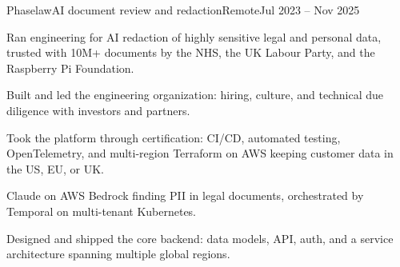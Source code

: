 \documentclass{resume}
\begin{document}
\begin{company}{Phaselaw}{AI document review and redaction}{Remote}{Jul 2023 -- Nov 2025} %
\begin{bullets}
    \item {} Ran engineering for AI redaction of highly sensitive
          legal and personal data, trusted with 10M+ documents by the NHS, the
          UK Labour Party, and the Raspberry Pi Foundation.
    \item {} Built and led the engineering organization: hiring,
          culture, and technical due diligence with investors and partners.
    \item {} Took the platform through certification: CI/CD,
          automated testing, OpenTelemetry, and multi-region Terraform on AWS
          keeping customer data in the US, EU, or UK\@.
    \item {} Claude on AWS Bedrock finding PII in legal
          documents, orchestrated by Temporal on multi-tenant Kubernetes.
\end{bullets}
\begin{bullets}
    \item {} Designed and shipped the core backend: data
          models, API, auth, and a service architecture spanning multiple
          global regions.
\end{bullets}
\end{company}
\end{document}
